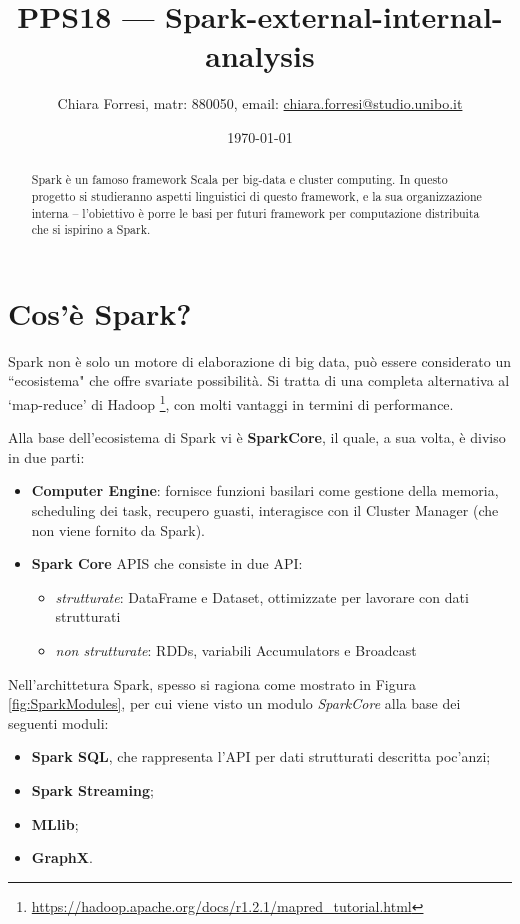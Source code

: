 \documentclass[12pt,italian]{article}
\title{PPS18  --- Spark-external-internal-analysis}
\author{Chiara Forresi, matr: 880050, email: {\url{chiara.forresi@studio.unibo.it}}}
\date{\today}
\begin{document}
\begin{titlingpage}
	\maketitle
	\begin{abstract}
		Spark è un famoso framework Scala per big-data e cluster computing. In questo progetto si studieranno aspetti linguistici di questo framework, e la sua organizzazione interna -- l'obiettivo è porre le basi per futuri framework per computazione distribuita che si ispirino a Spark.
	\end{abstract}
\end{titlingpage}
\nocite{*}
\tableofcontents
\newpage

\section{Cos'è Spark?}
Spark non è solo un motore di elaborazione di big data, può essere considerato un ``ecosistema" che offre svariate possibilità.
Si tratta di una completa alternativa al `map-reduce' di Hadoop \footnote{\url{https://hadoop.apache.org/docs/r1.2.1/mapred\_tutorial.html}}, con molti vantaggi in termini di performance. 
\par Alla base dell'ecosistema di Spark vi è \textbf{SparkCore}, il quale, a sua volta, è diviso in due parti:
\begin{itemize}
	\item \textbf{Computer Engine}: fornisce funzioni basilari come gestione della memoria, scheduling dei task, recupero guasti, interagisce con il Cluster Manager (che non viene fornito da Spark).
	\item \textbf{Spark Core} APIS che consiste in due API:
	\begin{itemize}
		\item \textit{strutturate}: DataFrame e Dataset, ottimizzate per lavorare con dati strutturati
		\item \textit{non strutturate}: RDDs, variabili Accumulators e Broadcast
	\end{itemize}
\end{itemize}
Nell'archittetura Spark, spesso si ragiona come mostrato in Figura \ref{fig:SparkModules}, per cui viene visto un modulo \textit{SparkCore} alla base dei seguenti moduli:
\begin{itemize}
	\item \textbf{Spark SQL}, che rappresenta l'API per dati strutturati descritta poc'anzi;
	\item  \textbf{Spark Streaming};
	\item \textbf{MLlib};
	\item \textbf{GraphX}.
\end{itemize}
\end{document}
